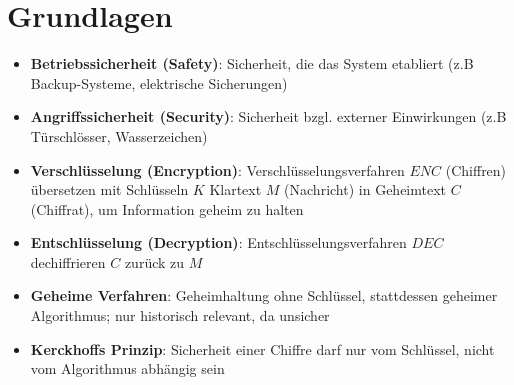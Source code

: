 \section{Grundlagen}%
\label{grund:sec:grundlagen}

\begin{itemize}
	\item \textbf{Betriebssicherheit (Safety)}: Sicherheit, die das System etabliert (z.B Backup-Systeme, elektrische Sicherungen)
	\item \textbf{Angriffssicherheit (Security)}: Sicherheit bzgl. externer Einwirkungen (z.B Türschlösser, Wasserzeichen)
	\item \textbf{Verschlüsselung (Encryption)}: Verschlüsselungsverfahren $ENC$ (Chiffren) übersetzen mit Schlüsseln $K$ Klartext $M$ (Nachricht) in Geheimtext $C$ (Chiffrat), um Information geheim zu halten
	\item \textbf{Entschlüsselung (Decryption)}: Entschlüsselungsverfahren $DEC$ dechiffrieren $C$ zurück zu $M$
	\item \textbf{Geheime Verfahren}: Geheimhaltung ohne Schlüssel, stattdessen geheimer Algorithmus; nur historisch relevant, da unsicher
	\item \textbf{Kerckhoffs Prinzip}: Sicherheit einer Chiffre darf nur vom Schlüssel, nicht vom Algorithmus abhängig sein
\end{itemize}